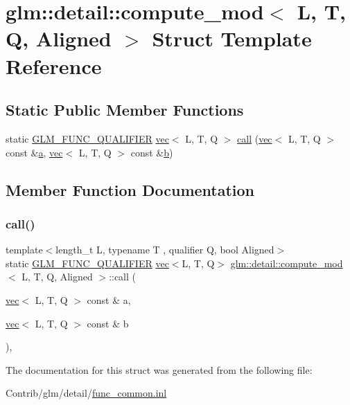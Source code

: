 \hypertarget{structglm_1_1detail_1_1compute__mod}{}\section{glm\+:\+:detail\+:\+:compute\+\_\+mod$<$ L, T, Q, Aligned $>$ Struct Template Reference}
\label{structglm_1_1detail_1_1compute__mod}
\subsection*{Static Public Member Functions}
\begin{DoxyCompactItemize}
\item 
static \mbox{\hyperlink{setup_8hpp_a33fdea6f91c5f834105f7415e2a64407}{G\+L\+M\+\_\+\+F\+U\+N\+C\+\_\+\+Q\+U\+A\+L\+I\+F\+I\+ER}} \mbox{\hyperlink{structglm_1_1vec}{vec}}$<$ L, T, Q $>$ \mbox{\hyperlink{structglm_1_1detail_1_1compute__mod_a91bba836ba6e6148d3626aad034a01aa}{call}} (\mbox{\hyperlink{structglm_1_1vec}{vec}}$<$ L, T, Q $>$ const \&\mbox{\hyperlink{_s_d_l__opengl__glext_8h_a3309789fc188587d666cda5ece79cf82}{a}}, \mbox{\hyperlink{structglm_1_1vec}{vec}}$<$ L, T, Q $>$ const \&\mbox{\hyperlink{_s_d_l__opengl__glext_8h_a0f71581a41fd2264c8944126dabbd010}{b}})
\end{DoxyCompactItemize}


\subsection{Member Function Documentation}
\mbox{\label{structglm_1_1detail_1_1compute__mod_a91bba836ba6e6148d3626aad034a01aa}} 
\subsubsection{\texorpdfstring{call()}{call()}}
{\footnotesize\ttfamily template$<$length\+\_\+t L, typename T , qualifier Q, bool Aligned$>$ \\
static \mbox{\hyperlink{setup_8hpp_a33fdea6f91c5f834105f7415e2a64407}{G\+L\+M\+\_\+\+F\+U\+N\+C\+\_\+\+Q\+U\+A\+L\+I\+F\+I\+ER}} \mbox{\hyperlink{structglm_1_1vec}{vec}}$<$L, T, Q$>$ \mbox{\hyperlink{structglm_1_1detail_1_1compute__mod}{glm\+::detail\+::compute\+\_\+mod}}$<$ L, T, Q, Aligned $>$\+::call (\begin{DoxyParamCaption}\item[{\mbox{\hyperlink{structglm_1_1vec}{vec}}$<$ L, T, Q $>$ const \&}]{a,  }\item[{\mbox{\hyperlink{structglm_1_1vec}{vec}}$<$ L, T, Q $>$ const \&}]{b }\end{DoxyParamCaption})\hspace{0.3cm}{\ttfamily [inline]}, {\ttfamily [static]}}



The documentation for this struct was generated from the following file\+:\begin{DoxyCompactItemize}
\item 
Contrib/glm/detail/\mbox{\hyperlink{func__common_8inl}{func\+\_\+common.\+inl}}\end{DoxyCompactItemize}
